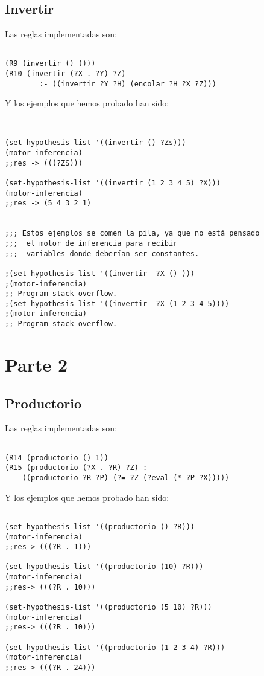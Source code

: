 \documentclass[nochap]{apuntes}
\begin{document}
\subsection*{Invertir}
Las reglas implementadas son:\\
\begin{lstlisting}[frame=single]

(R9 (invertir () ()))
(R10 (invertir (?X . ?Y) ?Z) 
		:- ((invertir ?Y ?H) (encolar ?H ?X ?Z)))
\end{lstlisting}
Y los ejemplos que hemos probado han sido:\\

\begin{lstlisting}[frame=single]


(set-hypothesis-list '((invertir () ?Zs)))
(motor-inferencia)
;;res -> (((?ZS)))

(set-hypothesis-list '((invertir (1 2 3 4 5) ?X)))
(motor-inferencia)
;;res -> (5 4 3 2 1)


;;; Estos ejemplos se comen la pila, ya que no está pensado
;;;	 el motor de inferencia para recibir
;;;	 variables donde deberían ser constantes.

;(set-hypothesis-list '((invertir  ?X () )))
;(motor-inferencia)
;; Program stack overflow.
;(set-hypothesis-list '((invertir  ?X (1 2 3 4 5))))
;(motor-inferencia)
;; Program stack overflow.

\end{lstlisting}


\section*{Parte 2}


\subsection*{Productorio}
Las reglas implementadas son:\\
\begin{lstlisting}[frame=single]

(R14 (productorio () 1))
(R15 (productorio (?X . ?R) ?Z) :- 
	((productorio ?R ?P) (?= ?Z (?eval (* ?P ?X)))))
\end{lstlisting}
Y los ejemplos que hemos probado han sido:\\

\begin{lstlisting}[frame=single]

(set-hypothesis-list '((productorio () ?R)))
(motor-inferencia)
;;res-> (((?R . 1)))

(set-hypothesis-list '((productorio (10) ?R)))
(motor-inferencia)
;;res-> (((?R . 10)))

(set-hypothesis-list '((productorio (5 10) ?R)))
(motor-inferencia)
;;res-> (((?R . 10)))

(set-hypothesis-list '((productorio (1 2 3 4) ?R)))
(motor-inferencia)
;;res-> (((?R . 24)))
\end{lstlisting}
\end{document}
